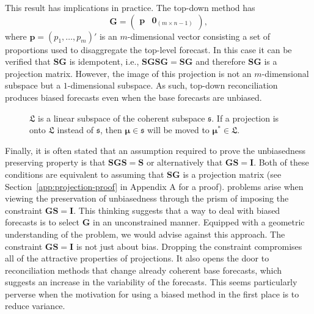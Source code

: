 \documentclass[12pt]{article}
\theoremstyle{definition}
\begin{document}
This result has implications in practice. The top-down method \citep{Gross1990} has
\begin{equation*}
  \bm{G} = \begin{pmatrix}
             \bm{p} & \bm{0}_{(m \times n-1)}
           \end{pmatrix},
\end{equation*}
where $\bm{p} = (p_1,\dots,p_m)'$ is an $m$-dimensional vector consisting a set of proportions used to disaggregate the top-level forecast. In this case it can be verified that $\bm{S}\bm{G}$ is idempotent, {\color{blue} i.e.,} $\bm{S}\bm{G}\bm{S}\bm{G}=\bm{S}\bm{G}$ and therefore $\bm{S}\bm{G}$ is a projection matrix. However, the image of this projection is not an $m$-dimensional subspace but a $1$-dimensional subspace. As such, top-down reconciliation produces biased forecasts even when the base forecasts are unbiased.

\begin{figure}[!hbt]
  \centering
  \vspace{-0.9cm}
  \small
  \resizebox{0.8\linewidth}{!}{
    
  }
  \caption{$\mathfrak{L}$ is a linear subspace of the coherent subspace $\mathfrak{s}$. If a projection is onto $\mathfrak{L}$ instead of $\mathfrak{s}$, then $\bm{\mu} \in \mathfrak{s}$ will be moved to $\bm{\mu}^* \in \mathfrak{L}$.}\label{fig:Schematic_3D}
\end{figure}

Finally, it is often stated that an assumption required to prove the unbiasedness preserving property is that $\bm{S}\bm{G}\bm{S}=\bm{S}$ or alternatively that $\bm{G}\bm{S}=\bm{I}$. Both of these conditions are equivalent to assuming that $\bm{S}\bm{G}$ is a projection matrix (see Section~\ref{app:projection-proof} in Appendix A for a proof). {\color{blue}{Despite this connection,}} problems arise when viewing the preservation of unbiasedness through the prism of imposing the constraint $\bm{G}\bm{S}=\bm{I}$. This thinking suggests that a way to deal with biased forecasts is to select $\bm{G}$ in an unconstrained manner. Equipped with a geometric understanding of the problem, we would advise against this approach. The constraint $\bm{G}\bm{S}=\bm{I}$ is not just about bias. Dropping the constraint compromises all of the attractive properties of projections. It also opens the door to reconciliation methods that change already coherent base forecasts, which suggests an increase in the variability of the forecasts. This seems particularly perverse when the motivation for using a biased method in the first place is to reduce variance.
\end{document}
